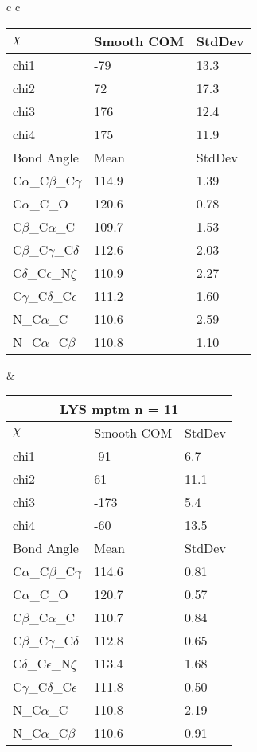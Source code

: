 \begin{longtable}{ c c }
\begin{tabular}{ l l l }
  $\chi$       & Smooth COM & StdDev \\ \midrule
  chi1 & -79 & 13.3 \\ 
  chi2 & 72 & 17.3 \\ 
  chi3 & 176 & 12.4 \\ 
  chi4 & 175 & 11.9 \\ \midrule
  Bond Angle   & Mean     & StdDev \\ \midrule
  C$\alpha$\_C$\beta$\_C$\gamma$ & 114.9 & 1.39\\
  C$\alpha$\_C\_O & 120.6 & 0.78\\
  C$\beta$\_C$\alpha$\_C & 109.7 & 1.53\\
  C$\beta$\_C$\gamma$\_C$\delta$ & 112.6 & 2.03\\
  C$\delta$\_C$\epsilon$\_N$\zeta$ & 110.9 & 2.27\\
  C$\gamma$\_C$\delta$\_C$\epsilon$ & 111.2 & 1.60\\
  N\_C$\alpha$\_C & 110.6 & 2.59\\
  N\_C$\alpha$\_C$\beta$ & 110.8 & 1.10\\
  \bottomrule
  \end{tabular}
  &
  \begin{tabular}{ l l l }
  \toprule
  \multicolumn{3}{c}{LYS \textbf{mptm} n = 11} \\ \toprule
  $\chi$       & Smooth COM & StdDev \\ \midrule
  chi1 & -91 & 6.7 \\ 
  chi2 & 61 & 11.1 \\ 
  chi3 & -173 & 5.4 \\ 
  chi4 & -60 & 13.5 \\ \midrule
  Bond Angle   & Mean     & StdDev \\ \midrule
  C$\alpha$\_C$\beta$\_C$\gamma$ & 114.6 & 0.81\\
  C$\alpha$\_C\_O & 120.7 & 0.57\\
  C$\beta$\_C$\alpha$\_C & 110.7 & 0.84\\
  C$\beta$\_C$\gamma$\_C$\delta$ & 112.8 & 0.65\\
  C$\delta$\_C$\epsilon$\_N$\zeta$ & 113.4 & 1.68\\
  C$\gamma$\_C$\delta$\_C$\epsilon$ & 111.8 & 0.50\\
  N\_C$\alpha$\_C & 110.8 & 2.19\\
  N\_C$\alpha$\_C$\beta$ & 110.6 & 0.91\\
  \bottomrule
  \end{tabular}
  \\

\end{longtable}
